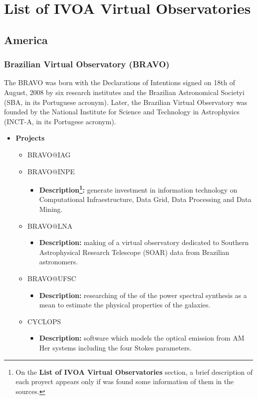 \section{List of IVOA Virtual Observatories}
\subsection{America}
\subsubsection{Brazilian Virtual Observatory (BRAVO)}
The BRAVO was born with the Declarations of Intentions signed on 18th of August,
2008 by six research institutes and the Brazilian Astronomical Societyi (SBA, in
its Portuguese acronym). Later, the Brazilian Virtual Observatory was founded by
the National Institute for Science and Technology in Astrophysics (INCT-A, in
its Portugese acronym).

\begin{itemize}
\item \textbf{Projects}
\begin{itemize}
\item BRAVO@IAG
\item BRAVO@INPE
\begin{itemize}
\item \textbf{Description\footnote{On the \textbf{List of IVOA Virtual
Observatories} section, a brief description of each proyect appears only if was
found some information of them in the sources.}:} generate investment in
information technology on Computational Infraestructure, Data Grid, Data
Processing and Data Mining.
\end{itemize}
\item BRAVO@LNA
\begin{itemize}
\item \textbf{Description:} making of a virtual observatory dedicated to
Southern Astrophysical Research Telescope (SOAR) data from Brazilian
astronomers.  
\end{itemize}
\item BRAVO@UFSC
\begin{itemize}
\item \textbf{Description:} researching of the of the power spectral synthesis
as a mean to estimate the physical properties of the galaxies.
\end{itemize}
\item CYCLOPS
\begin{itemize}
\item \textbf{Description:} software which models the optical emission from AM
Her systems including the four Stokes parameters.
\end{itemize}
\end{itemize}
\end{itemize}

